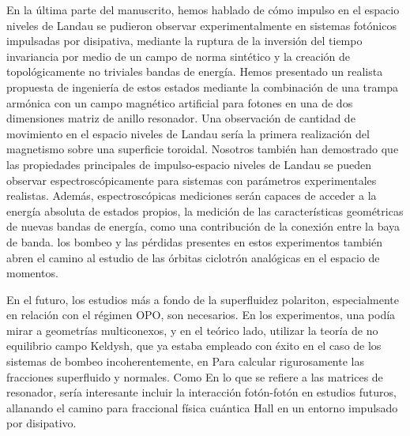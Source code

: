 En la última parte del manuscrito, hemos hablado de cómo impulso en el
espacio niveles de Landau se pudieron observar experimentalmente en
sistemas fotónicos impulsadas por disipativa, mediante la ruptura de
la inversión del tiempo invariancia por medio de un campo de norma
sintético y la creación de topológicamente no triviales bandas de
energía. Hemos presentado un realista propuesta de ingeniería de estos
estados mediante la combinación de una trampa armónica con un campo
magnético artificial para fotones en una de dos dimensiones matriz de
anillo resonador. Una observación de cantidad de movimiento en el
espacio niveles de Landau sería la primera realización del magnetismo
sobre una superficie toroidal. Nosotros también han demostrado que las
propiedades principales de impulso-espacio niveles de Landau se pueden
observar espectroscópicamente para sistemas con parámetros
experimentales realistas. Además, espectroscópicas mediciones serán
capaces de acceder a la energía absoluta de estados propios, la
medición de las características geométricas de nuevas bandas de
energía, como una contribución de la conexión entre la baya de
banda. los bombeo y las pérdidas presentes en estos experimentos
también abren el camino al estudio de las órbitas ciclotrón analógicas
en el espacio de momentos.

En el futuro, los estudios más a fondo de la superfluidez polariton,
especialmente en relación con el régimen OPO, son necesarios. En los
experimentos, una podía mirar a geometrías multiconexos, y en el
teórico lado, utilizar la teoría de no equilibrio campo Keldysh, que
ya estaba empleado con éxito en el caso de los sistemas de bombeo
incoherentemente, en Para calcular rigurosamente las fracciones
superfluido y normales. Como En lo que se refiere a las matrices de
resonador, sería interesante incluir la interacción fotón-fotón en
estudios futuros, allanando el camino para fraccional física cuántica
Hall en un entorno impulsado por disipativo.


